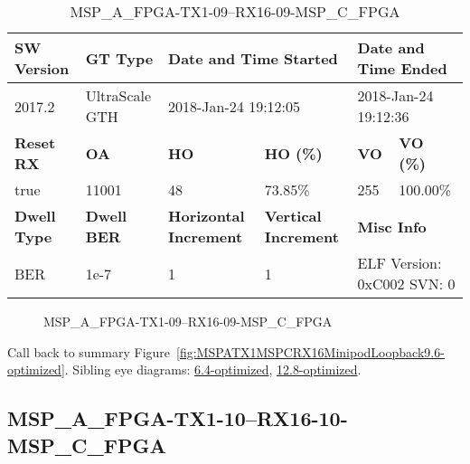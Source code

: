 \begin{table}[h]
\centering
\caption{MSP\_A\_FPGA-TX1-09--RX16-09-MSP\_C\_FPGA}
\label{tab:MSPAFPGATX109RX1609MSPCFPGA9.6-optimized}
\begin{tabular}{@{}|l|l|l|l|l|l|@{}}
\toprule
\textbf{SW Version}                & \textbf{GT Type}   & \multicolumn{2}{l|}{\textbf{Date and Time Started}}            & \multicolumn{2}{l|}{\textbf{Date and Time Ended}}        \\ \midrule
2017.2                       & UltraScale GTH          & \multicolumn{2}{l|}{2018-Jan-24 19:12:05}                   & \multicolumn{2}{l|}{2018-Jan-24 19:12:36}               \\ \midrule
\textbf{Reset RX}                  & \textbf{OA} & \textbf{HO}   & \textbf{HO (\%)} & \textbf{VO} & \textbf{VO (\%)} \\ \midrule
true & 11001        & 48          & 73.85\%        & 255        & 100.00\%       \\ \midrule
\textbf{Dwell Type}                & \textbf{Dwell BER} & \textbf{Horizontal Increment} & \textbf{Vertical Increment}    & \multicolumn{2}{l|}{\textbf{Misc Info}}                  \\ \midrule
BER                            & 1e-7        & 1        & 1           & \multicolumn{2}{l|}{ELF Version: 0xC002 SVN: 0}                         \\ \bottomrule
\end{tabular}
\end{table}

\begin{figure}[h]
\caption{MSP\_A\_FPGA-TX1-09--RX16-09-MSP\_C\_FPGA} \label{fig:MSPAFPGATX109RX1609MSPCFPGA9.6-optimized}
\end{figure}

Call back to summary Figure~\ref{fig:MSPATX1MSPCRX16MinipodLoopback9.6-optimized}.
Sibling eye diagrams: \hyperref[sec:MSPAFPGATX109RX1609MSPCFPGA6.4-optimized]{6.4-optimized}, \hyperref[sec:MSPAFPGATX109RX1609MSPCFPGA12.8-optimized]{12.8-optimized}.

\clearpage
\newpage


\subsection{MSP\_A\_FPGA-TX1-10--RX16-10-MSP\_C\_FPGA}\label{sec:MSPAFPGATX110RX1610MSPCFPGA9.6-optimized}

